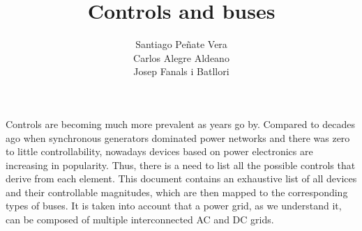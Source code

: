 \documentclass[11pt]{article}
\title{Controls and buses}
\author{Santiago Pe\~nate Vera \\ 
		Carlos Alegre Aldeano \\
		Josep Fanals i Batllori}
\begin{document}
	
	\maketitle
	
	Controls are becoming much more prevalent as years go by. Compared to decades ago when synchronous generators dominated power networks and there was zero to little controllability, nowadays devices based on power electronics are increasing in popularity. Thus, there is a need to list all the possible controls that derive from each element. This document contains an exhaustive list of all devices and their controllable magnitudes, which are then mapped to the corresponding types of buses. It is taken into account that a power grid, as we understand it, can be composed of multiple interconnected AC and DC grids.  
\end{document}

